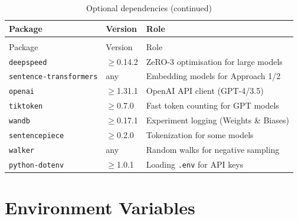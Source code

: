 \documentclass[11pt,a4paper,oneside,openany]{book}
\theoremstyle{definition}
\begin{document}
\begin{longtable}{lp{3cm}p{9cm}}
	\caption{Optional dependencies}
	\label{tab:deps-opt}                                                                  \\
	\toprule
	Package                        & Version     & Role                                   \\
	\midrule
	\endfirsthead
	\caption[]{Optional dependencies (continued)}                                         \\
	\toprule
	Package                        & Version     & Role                                   \\
	\midrule
	\endhead
	\bottomrule
	\endfoot
	\texttt{deepspeed}             & $\ge$0.14.2 & ZeRO-3 optimisation for large models   \\
	\texttt{sentence-transformers} & any         & Embedding models for Approach 1/2      \\
	\texttt{openai}                & $\ge$1.31.1 & OpenAI API client (GPT-4/3.5)          \\
	\texttt{tiktoken}              & $\ge$0.7.0  & Fast token counting for GPT models     \\
	\texttt{wandb}                 & $\ge$0.17.1 & Experiment logging (Weights \& Biases) \\
	\texttt{sentencepiece}         & $\ge$0.2.0  & Tokenization for some models           \\
	\texttt{walker}                & any         & Random walks for negative sampling     \\
	\texttt{python-dotenv}         & $\ge$1.0.1  & Loading \texttt{.env} for API keys     \\
\end{longtable}

\section{Environment Variables}
\end{document}
